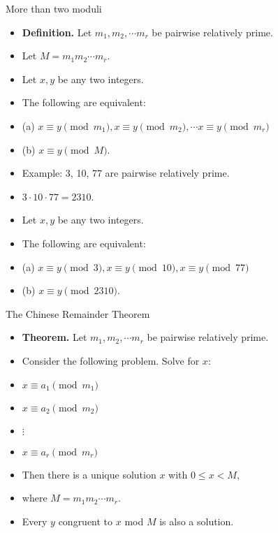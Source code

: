\documentclass[handout]{beamer}
\begin{document}
\begin{frame}{More than two moduli}

\begin{itemize}
  \item \textbf{Definition.} Let $m_1, m_2, \cdots m_r$  be pairwise relatively prime.
  \item Let $M= m_1 m_2 \cdots m_r$.
  \item Let $x,y$ be any two integers.
  \item The following are equivalent:
  \item (a) $x\equiv y \pmod {m_1}, x\equiv y \pmod {m_2}, \cdots x\equiv y \pmod {m_r}$
  \item (b) $x\equiv y \pmod M$.
  \item Example: 3, 10, 77 are pairwise relatively prime.
  \item $3\cdot 10 \cdot 77 = 2310$.
  \item Let $x,y$ be any two integers.
  \item The following are equivalent:
  \item (a) $x\equiv y \pmod {3}, x\equiv y \pmod {10}, x\equiv y \pmod {77}$
  \item (b) $x\equiv y \pmod {2310}$.
\end{itemize}

\end{frame}


\begin{frame}{The Chinese Remainder Theorem}

\begin{itemize}
  \item \textbf{Theorem.} Let $m_1, m_2, \cdots m_r$  be pairwise relatively prime.
  \item Consider the following problem. Solve for $x$:
  \item $x \equiv a_1 \pmod {m_1}$
  \item $x \equiv a_2 \pmod {m_2}$
  \item $\vdots$
  \item $x \equiv a_r \pmod {m_r}$
  \item Then there is a unique solution $x$ with $0\leq x < M$,
  \item where $M=m_1 m_2 \cdots m_r$.
  \item Every $y$ congruent to $x$ mod $M$ is also a solution.
\end{itemize}

\end{frame}
\end{document}
